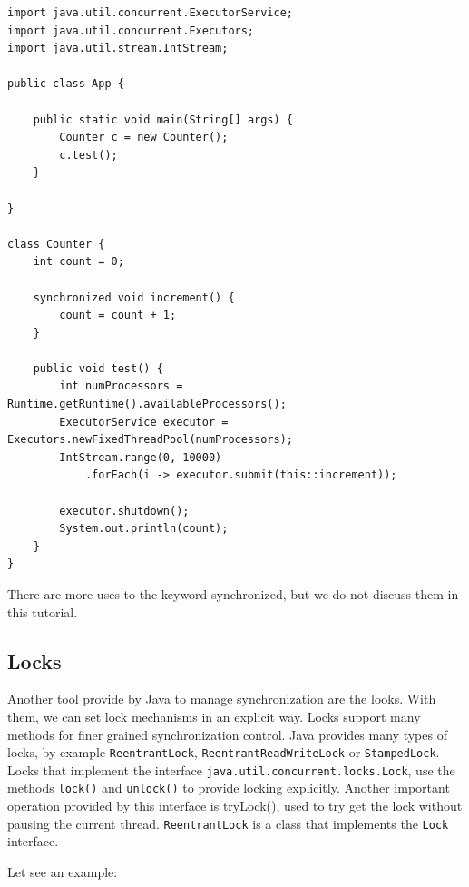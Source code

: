 \documentclass[openany, a4paper]{book}
\theoremstyle{break}
\theoremstyle{example}
\theoremstyle{note}
\theoremstyle{break}
\theoremstyle{exercise}
\begin{document}
\begin{verbatim}
import java.util.concurrent.ExecutorService;
import java.util.concurrent.Executors;
import java.util.stream.IntStream;

public class App {

    public static void main(String[] args) {
        Counter c = new Counter();
        c.test();
    }

}

class Counter {
    int count = 0;

    synchronized void increment() {
        count = count + 1;
    }

    public void test() {
        int numProcessors = Runtime.getRuntime().availableProcessors();
        ExecutorService executor = Executors.newFixedThreadPool(numProcessors);
        IntStream.range(0, 10000)
            .forEach(i -> executor.submit(this::increment));

        executor.shutdown();
        System.out.println(count);
    }
}
\end{verbatim}

There are more uses to the keyword synchronized, but we do not discuss them
in this tutorial.


\subsection{Locks}
\label{sec:org087dab8}


Another tool provide by Java to manage synchronization are the looks. With
them, we can set lock mechanisms in an explicit way. Locks support many
methods for finer grained synchronization control. Java provides many types
of locks, by  example \texttt{ReentrantLock}, \texttt{ReentrantReadWriteLock} or
\texttt{StampedLock}. Locks that implement the interface
\texttt{java.util.concurrent.locks.Lock}, use the methods \texttt{lock()} and \texttt{unlock()} to
provide locking explicitly. Another important operation provided by this
interface is tryLock(), used to try get the lock without pausing the current
thread. \texttt{ReentrantLock} is a class that implements the \texttt{Lock} interface.

Let see an example:
\end{document}
